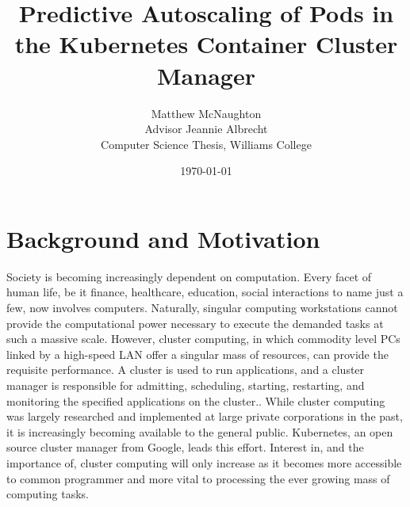 \documentclass[letterpaper,11pt,twocolumn]{article}
\begin{document}
\title{Predictive Autoscaling of Pods in the Kubernetes Container Cluster
Manager}
\date{\today}

\author{
  {\rm Matthew McNaughton}\\
  Advisor Jeannie Albrecht\\
  Computer Science Thesis, Williams College
}

\maketitle

\thispagestyle{empty}

\section{Background and Motivation}
Society is becoming increasingly dependent on computation. Every facet of human
life, be it finance, healthcare, education, social interactions to name just a
few, now involves computers.\cite[pg. 4]{distributed-systems-concepts-and-design}
Naturally, singular computing workstations cannot provide the computational
power necessary to execute the demanded tasks at such a massive scale.\cite[pg.
2]{distributed-systems-principles-and-paradigms} However, cluster computing,
in which commodity level PCs linked by a
high-speed LAN offer a singular mass of resources,
can provide the requisite performance.\cite[pg.
17]{distributed-systems-principles-and-paradigms}
A cluster is used to run applications, and a cluster manager is responsible for
admitting, scheduling, starting, restarting, and monitoring the specified
applications on the cluster.\cite[pg. 1]{borg}. While cluster computing was largely
researched and implemented at large private corporations in the past, it is
increasingly becoming available to the general public. Kubernetes, an open
source cluster manager from Google, leads this effort.\cite{k8s-website}
Interest in, and the importance of, cluster computing will only increase as it
becomes more accessible to common programmer and more vital to processing the ever
growing mass of computing tasks.
\end{document}
